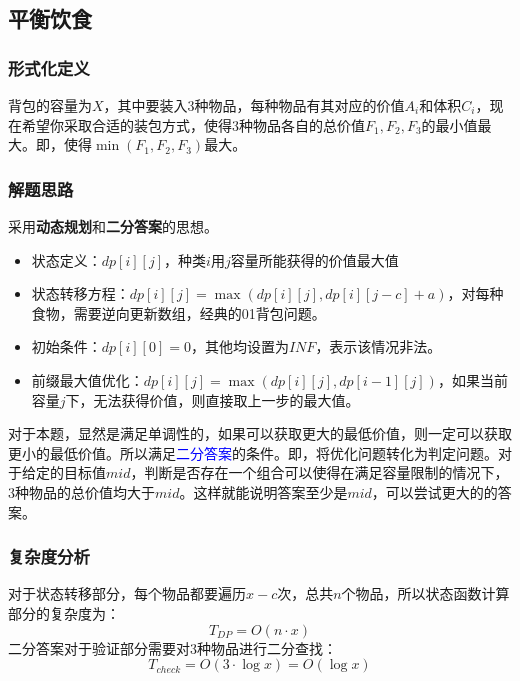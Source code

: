 \documentclass[../mainReport.tex]{subfiles}
\begin{document}
\subsection{平衡饮食}
\subsubsection{形式化定义}
背包的容量为$X$，其中要装入3种物品，每种物品有其对应的价值$A_i$和体积$C_i$，现在希望你采取合适的装包方式，使得3种物品各自的总价值$F_1,F_2,F_3$的最小值最大。即，使得$\min(F_1,F_2,F_3)$最大。

\subsubsection{解题思路}
采用\textbf{动态规划}和\textbf{二分答案}的思想。

\begin{itemize}
    \item 状态定义：$dp[i][j]$，种类$i$用$j$容量所能获得的价值最大值
    \item 状态转移方程：$dp[i][j]=\max(dp[i][j], dp[i][j-c] + a)$，对每种食物，需要逆向更新数组，经典的01背包问题。
    \item 初始条件：$dp[i][0] = 0$，其他均设置为$INF$，表示该情况非法。 
    \item 前缀最大值优化：$dp[i][j] = \max(dp[i][j], dp[i-1][j])$，如果当前容量$j$下，无法获得价值，则直接取上一步的最大值。
\end{itemize}

对于本题，显然是满足单调性的，如果可以获取更大的最低价值，则一定可以获取更小的最低价值。所以满足\textcolor{blue}{二分答案}的条件。即，将优化问题转化为判定问题。对于给定的目标值$mid$，判断是否存在一个组合可以使得在满足容量限制的情况下，3种物品的总价值均大于$mid$。这样就能说明答案至少是$mid$，可以尝试更大的的答案。



\subsubsection{复杂度分析}
对于状态转移部分，每个物品都要遍历$x-c$次，总共$n$个物品，所以状态函数计算部分的复杂度为：
\[
    T_{DP}=O(n\cdot x)
\]
二分答案对于验证部分需要对3种物品进行二分查找：
\[
    T_{check}=O(3\cdot\log x)=O(\log x)
\]
\end{document}
